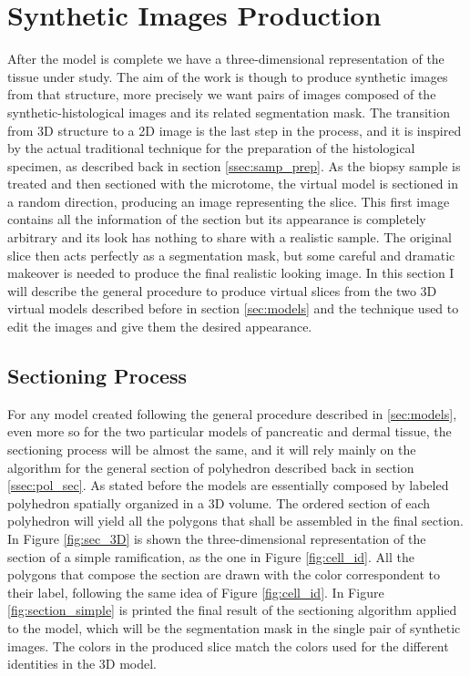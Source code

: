 \section{Synthetic Images Production} \label{sec:synth_image}
    After the model is complete we have a three-dimensional representation of the tissue under study. The aim of the work is though to produce synthetic images from that structure, more precisely we want pairs of images composed of the synthetic-histological images and its related segmentation mask. The transition from 3D structure to a 2D image is the last step in the process, and it is inspired by the actual traditional technique for the preparation of the histological specimen, as described back in section \ref{ssec:samp_prep}. As the biopsy sample is treated and then sectioned with the microtome, the virtual model is sectioned in a random direction, producing an image representing the slice. This first image contains all the information of the section but its appearance is completely arbitrary and its look has nothing to share with a realistic sample. The original slice then acts perfectly as a segmentation mask, but some careful and dramatic makeover is needed to produce the final realistic looking image. In this section I will describe the general procedure to produce virtual slices from the two 3D virtual models described before in section \ref{sec:models} and the technique used to edit the images and give them the desired appearance.

\subsection{Sectioning Process} \label{ssec:sect_proc}
    For any model created following the general procedure described in \ref{sec:models}, even more so for the two particular models of pancreatic and dermal tissue, the sectioning process will be almost the same, and it will rely mainly on the algorithm for the general section of polyhedron described back in section \ref{ssec:pol_sec}. As stated before the models are essentially composed by labeled polyhedron spatially organized in a 3D volume. The ordered section of each polyhedron will yield all the polygons that shall be assembled in the final section.
    In Figure \ref{fig:sec_3D} is shown the three-dimensional representation of the section of a simple ramification, as the one in Figure \ref{fig:cell_id}. All the polygons that compose the section are drawn with the color correspondent to their label, following the same idea of Figure \ref{fig:cell_id}. In Figure \ref{fig:section_simple} is printed the final result of the sectioning algorithm applied to the model, which will be the segmentation mask in the single pair of synthetic images. The colors in the produced slice match the colors used for the different identities in the 3D model.

